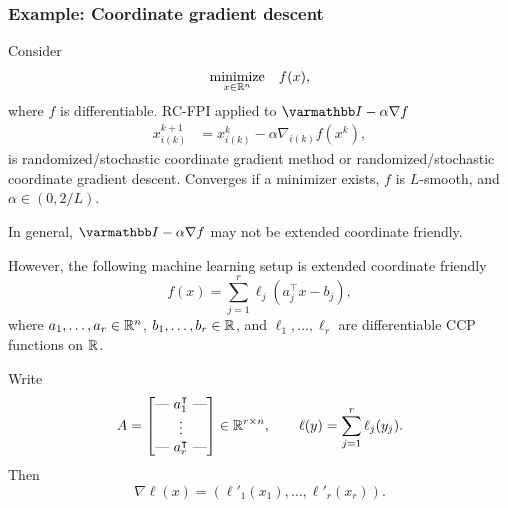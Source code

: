 \documentclass[10pt,mathserif]{beamer}
\begin{document}
\begin{frame}
\frametitle{Example: Coordinate gradient descent}
Consider 
\begin{align*}
\begin{array}{ll}
\underset{x\in \mathbb{R}^n}{\mbox{minimize}}
  &f(x),
  \end{array}
\end{align*}
where $f$ is differentiable.
RC-FPI applied to $\opI - \alpha \nabla f$
\begin{align*}
  x^{k+1}_{i(k)} & = x^{k}_{i(k)} - \alpha \nabla_{i(k)}f(x^{k}),
\end{align*}
is randomized/stochastic coordinate gradient method or randomized/stochastic coordinate gradient descent.
Converges if a minimizer exists, $f$ is $L$-smooth, and $\alpha\in (0,2/L)$.

\end{frame}

\begin{frame}
In general, $\opI - \alpha \nabla f$ may not be extended coordinate friendly.

\medskip

However, the following machine learning setup is extended coordinate friendly
\[
  f(x)  =\sum_{j=1}^{r} \ell_j(a_j^\intercal x - b_j),
\]
where $a_1,\dots,a_r\in \mathbb{R}^n$, $b_1,\dots,b_r\in \mathbb{R}$, and $\ell_1,\dots,\ell_r$ are differentiable CCP functions on $\mathbb{R}$.
\vspace{0.2in}

Write
\begin{align*}
  A = \begin{bmatrix}
        \text{---}~ a_1^\intercal ~\text{---}\\
         \vdots \\
        \text{---}~ a_r^\intercal ~\text{---}
       \end{bmatrix}\in\mathbb{R}^{r\times n},
       \qquad
       \ell(y)=\sum^r_{j=1}\ell_j(y_j).
\end{align*}
Then
\[
\nabla \ell(x)=(\ell'_1(x_1),\dots,\ell'_r(x_r)).
\]
\end{frame}
\end{document}
